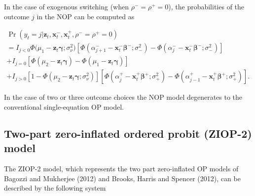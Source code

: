 \documentclass[letterpaper,fleqn,12pt]{article}
\begin{document}
In the case of exogenous switching (when $\rho ^{-}=\rho ^{+}=0$), the
probabilities of the outcome $j$ in the NOP can be computed as

\begin{center}
$%
\begin{array}{l}
\Pr (y_{t}=j|\mathbf{z}_{t},\mathbf{x}_{t}^{-},\mathbf{x}_{t}^{+},\rho
^{-}=\rho ^{+}=0) \\ 
=I_{j<0}\Phi (\mu _{1}-\mathbf{z}_{t}\mathbf{\gamma ;}\sigma _{\nu }^{2}%
\mathbf{)}[\Phi (\alpha _{j+1}^{-}-\mathbf{x}_{t}^{-}\mathbf{\beta }%
^{-};\sigma _{-}^{2})-\Phi (\alpha _{j}^{-}-\mathbf{x}_{t}^{-}\mathbf{\beta }%
^{-};\sigma _{-}^{2})] \\ 
+I_{j=0}[\Phi (\mu _{2}-\mathbf{z}_{t}\mathbf{\gamma })-\Phi (\mu _{1}-%
\mathbf{z}_{t}\mathbf{\gamma })] \\ 
+I_{j>0}[1-\Phi (\mu _{2}-\mathbf{z}_{t}\mathbf{\gamma ;}\sigma _{\nu
}^{2})][\Phi (\alpha _{j}^{+}-\mathbf{x}_{t}^{+}\mathbf{\beta }^{+};\sigma
_{+}^{2})-\Phi (\alpha _{j-1}^{+}-\mathbf{x}_{t}^{+}\mathbf{\beta }%
^{+};\sigma _{+}^{2})]\text{.}%
\end{array}%
$
\end{center}

In the case of two or three outcome choices the NOP model degenerates to the
conventional single-equation OP model.

\subsection{Two-part zero-inflated ordered probit (ZIOP-2) model}

The ZIOP-2 model, which represents the two part zero-inflated OP models of
Bagozzi and Mukherjee (2012) and Brooks, Harris and Spencer (2012), can be
described by the following system

\medskip
\end{document}
